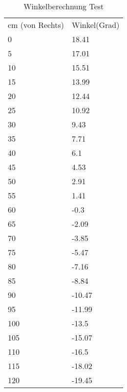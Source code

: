 \begin{table}[htbp]
  \centering
  \caption{Winkelberechnung Test}
    \begin{tabular}{ll}
    
    cm (von Rechts) & Winkel(Grad)  \\
    
    0     & 18.41 \\
    5     & 17.01 \\
    10    & 15.51 \\
    15    & 13.99 \\
    20    & 12.44 \\
    25    & 10.92 \\
    30    & 9.43 \\
    35    & 7.71 \\
    40    & 6.1 \\
    45    & 4.53 \\
    50    & 2.91 \\
    55    & 1.41 \\
    60    & -0.3 \\
    65    & -2.09 \\
    70    & -3.85 \\
    75    & -5.47 \\
    80    & -7.16 \\
    85    & -8.84 \\
    90    & -10.47 \\
    95    & -11.99 \\
    100   & -13.5 \\
    105   & -15.07 \\
    110   & -16.5 \\
    115   & -18.02 \\
    120   & -19.45 \\
    
    \end{tabular}%
  \label{tab:Korberkennungwinkel}%
\end{table}%
